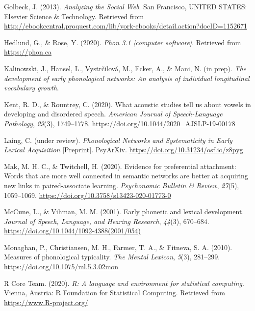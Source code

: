 \documentclass[
  man]{apa6}
\newlength{\cslhangindent}
\newlength{\cslentryspacingunit} %
\newenvironment{CSLReferences}[2] %
 {%
  \setlength{\parindent}{0pt}
  \ifodd #1
  \let\oldpar\par
  \def\par{\hangindent=\cslhangindent\oldpar}
  \fi
  \setlength{\parskip}{#2\cslentryspacingunit}
 }%
 {}
\begin{document}
\begin{CSLReferences}{1}{0}
\leavevmode{}%
Golbeck, J. (2013). \emph{Analyzing the {Social} {Web}}. San Francisco, UNITED STATES: Elsevier Science \& Technology. Retrieved from \url{http://ebookcentral.proquest.com/lib/york-ebooks/detail.action?docID=1152671}

\leavevmode{}%
Hedlund, G., \& Rose, Y. (2020). \emph{Phon 3.1 {[}computer software{]}}. Retrieved from \url{https://phon.ca}

\leavevmode{}%
Kalinowski, J., Hansel, L., Vystrčilová, M., Ecker, A., \& Mani, N. (in prep). \emph{The development of early phonological networks: {An} analysis of individual longitudinal vocabulary growth}.

\leavevmode{}%
Kent, R. D., \& Rountrey, C. (2020). What acoustic studies tell us about vowels in developing and disordered speech. \emph{American Journal of Speech-Language Pathology}, \emph{29}(3), 1749--1778. \url{https://doi.org/10.1044/2020_AJSLP-19-00178}

\leavevmode{}%
Laing, C. (under review). \emph{Phonological {Networks} and {Systematicity} in {Early} {Lexical} {Acquisition}} {[}Preprint{]}. PsyArXiv. \url{https://doi.org/10.31234/osf.io/z8pyg}

\leavevmode{}%
Mak, M. H. C., \& Twitchell, H. (2020). Evidence for preferential attachment: Words that are more well connected in semantic networks are better at acquiring new links in paired-associate learning. \emph{Psychonomic Bulletin \& Review}, \emph{27}(5), 1059--1069. \url{https://doi.org/10.3758/s13423-020-01773-0}

\leavevmode{}%
McCune, L., \& Vihman, M. M. (2001). Early phonetic and lexical development. \emph{Journal of Speech, Language, and Hearing Research}, \emph{44}(3), 670--684. \url{https://doi.org/10.1044/1092-4388(2001/054)}

\leavevmode{}%
Monaghan, P., Christiansen, M. H., Farmer, T. A., \& Fitneva, S. A. (2010). Measures of phonological typicality. \emph{The Mental Lexicon}, \emph{5}(3), 281--299. \url{https://doi.org/10.1075/ml.5.3.02mon}

\leavevmode{}%
R Core Team. (2020). \emph{R: A language and environment for statistical computing}. Vienna, Austria: R Foundation for Statistical Computing. Retrieved from \url{https://www.R-project.org/}


\end{CSLReferences}
\end{document}
